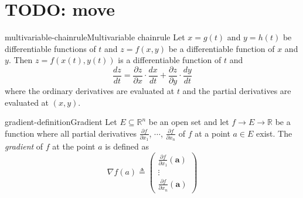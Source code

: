 \documentclass[preview]{standalone}
\begin{document}
\section{TODO: move}

\begin{snippettheorem}{multivariable-chainrule}{Multivariable chainrule}
    Let \(x=g(t)\) and \(y=h(t)\) be differentiable functions of \(t\)
    and \(z=f(x,y)\) be a differentiable function of \(x\) and \(y\).
    Then \(z=f(x(t), y(t))\) is a differentiable function of \(t\) and
    \[
        \frac{dz}{dt} =
        \frac{\partial z}{\partial x} \cdot \frac{dx}{dt} +
        \frac{\partial z}{\partial y} \cdot \frac{dy}{dt}
    \]
    where the ordinary derivatives are evaluated at \(t\) and the partial
    derivatives are evaluated at \((x,y)\).
\end{snippettheorem}

\begin{snippetdefinition}{gradient-definition}{Gradient}
    Let \(E \subseteq {\mathbb{R}}^n\) be an open set and
    let \(f\to E \to \mathbb{R}\) be a function where
    all partial derivatives \(\frac{\partial f}{\partial x_1}\),
    \(\cdots\), \(\frac{\partial f}{\partial x_n}\) of \(f\)
    at a point \(a\in E\) exist.
    The \textit{gradient} of \(f\) at the point \(a\)
    is defined as
    \[
        \nabla f(a) \triangleq
        \left(\begin{array}{c}
        \frac{\partial f}{\partial x_1}(\mathbf{a}) \\
        \vdots \\
        \frac{\partial f}{\partial x_n}(\mathbf{a})
        \end{array}\right)
    \]
\end{snippetdefinition}
\end{document}
